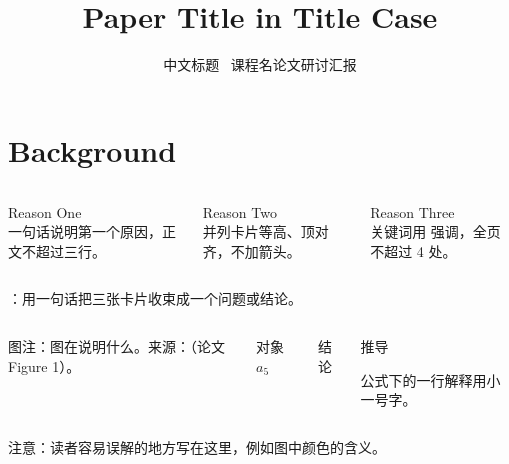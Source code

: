 \documentclass[aspectratio=169,10pt,t]{beamer}
\title{Paper Title in Title Case}
\subtitle{中文标题 \muted{——}\ 课程名\dotsep 论文研讨汇报}
\begin{document}
\begin{frame}[plain]
  \titlepage
\end{frame}

\section{Background}
\begin{frame}
  \begin{columns}[T,onlytextwidth]
      \begin{warmcard}[\linewidth][2.6cm]{Reason One\\}
        一句话说明第一个原因，正文不超过三行。
      \end{warmcard}
      \begin{warmcard}[\linewidth][2.6cm]{Reason Two\\}
        并列卡片等高、顶对齐，不加箭头。
      \end{warmcard}
      \begin{warmcard}[\linewidth][2.6cm]{Reason Three\\}
        关键词用  强调，全页不超过 4 处。
      \end{warmcard}
  \end{columns}
  \vspace{4pt}
  \begin{takeaway}
    ：用一句话把三张卡片收束成一个问题或结论。
  \end{takeaway}
\end{frame}

\begin{frame}
  \begin{columns}[T,onlytextwidth]
        {图注：图在说明什么。来源：（论文 Figure 1）。}
      \begin{callout}{对象}
        $a_5$\ 
      \end{callout}
      \begin{warmcard}{结论}
      \end{warmcard}
      \begin{warmcard}{推导}
        {\densesize 公式下的一行解释用小一号字。\par}
      \end{warmcard}
  \end{columns}
  \vfill
  \begin{fignote}
    注意：读者容易误解的地方写在这里，例如图中颜色的含义。
  \end{fignote}
\end{frame}
\end{document}
